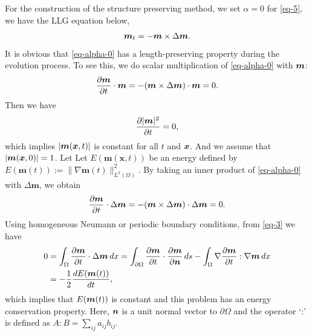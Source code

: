\documentclass[preprint,times,3p]{elsarticle}
\def\m{\mbox{\boldmath $m$}}
\def\n{\mbox{\boldmath $n$}}
\def\x{\mbox{\boldmath $x$}}
\begin{document}

For the construction of the structure preserving method, we set $\alpha=0$ for \cref{eq-5}, we have the LLG equation below,
\begin{align}\label{eq-alpha-0}
\m_t=-\m\times\Delta\m.
\end{align}
It is obvious that \cref{eq-alpha-0} has a length-preserving property during the evolution process. To see this, we do scalar multiplication of \cref{eq-alpha-0} with $\m$:
\begin{align*}
    \frac{\partial \m}{\partial t} \cdot \m = -(\m \times \Delta \m) \cdot \m = 0.
\end{align*}
Then we have 
\begin{align*}
    \frac{\partial|\m|^2}{\partial t}=0,
\end{align*}
which implies $|\m(\x,t)|$ is constant for all $t$ and $\x$. And we assume that $|\m(\x,0)|=1$. Let 
Let \( E(\mathbf{m}(\mathbf{x}, t)) \) be an energy defined by \( E(\mathbf{m}(t)) := \|\nabla \mathbf{m}(t)\|_{L^2(\Omega)}^2 \). By taking an inner product of \cref{eq-alpha-0} with \( \Delta \mathbf{m} \), we obtain
\begin{align}\label{eq-3}
    \frac{\partial {\m}}{\partial t} \cdot \Delta {\m} = -({\m} \times \Delta {\m}) \cdot \Delta {\m} = 0. 
\end{align}
Using homogeneous Neumann or periodic boundary conditions, from \cref{eq-3} we have
\begin{align*}
    \begin{aligned}
0 &= \int_\Omega \frac{\partial {\m}}{\partial t} \cdot \Delta {\m}\, dx
   = \int_{\partial\Omega} \frac{\partial {\m}}{\partial t} \cdot \frac{\partial {\m}}{\partial {\n}}\, ds
   - \int_\Omega \nabla \frac{\partial {\m}}{\partial t} : \nabla {\m}\, dx \\
&= -\frac{1}{2} \frac{dE({\m}(t))}{dt},
\end{aligned}
\end{align*}
which implies that \(E({\m}(t))\) is constant and this problem has an energy conservation property. Here, \({\n}\) is a unit normal vector to \(\partial\Omega\) and the operator `:' is defined as \(A:B = \sum_{ij} a_{ij} b_{ij}\).
 
\end{document}
